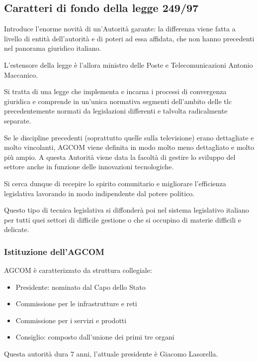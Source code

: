 \subsection{Caratteri di fondo della legge 249/97}

Introduce l'enorme novità di un'Autorità garante: la differenza viene fatta a livello di entità dell'autorità e di poteri ad essa affidata, che non hanno precedenti nel panorama giuridico italiano.

L'estensore della legge è l'allora ministro delle Poste e Telecomunicazioni Antonio Maccanico.

Si tratta di una legge che implementa e incarna i processi di convergenza giuridica e comprende in un'unica normativa segmenti dell'ambito delle tlc precedentemente normati da legislazioni differenti e talvolta radicalmente separate.

Se le discipline precedenti (soprattutto quelle sulla televisione) erano dettagliate e molto vincolanti, AGCOM viene definita in modo molto meno dettagliato e molto più ampio. 
A questa Autorità viene data la facoltà di gestire lo sviluppo del settore anche in funzione delle innovazioni tecnologiche. 

Si cerca dunque di recepire lo spirito comunitario e migliorare l'efficienza legislativa lavorando in modo indipendente dal potere politico. 

Questo tipo di tecnica legislativa si diffonderà poi nel sistema legislativo italiano per tutti quei settori di difficile gestione o che si occupino di materie difficili e delicate. 


\subsubsection{Istituzione dell'AGCOM}
AGCOM è caratterizzato da struttura collegiale:
\begin{itemize}
    \item Presidente: nominato dal Capo dello Stato
    \item Commissione per le infrastrutture e reti
    \item Commissione per i servizi e prodotti
    \item Consiglio: composto dall'unione dei primi tre organi
\end{itemize}

Questa autorità dura 7 anni, l'attuale presidente è Giacomo Lasorella. 

